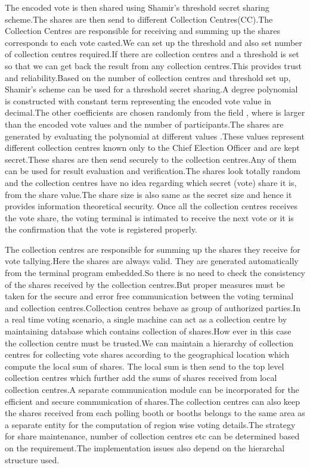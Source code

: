 \documentclass[conference]{IEEEtran}
\begin{document}
The encoded vote is then shared using Shamir's threshold secret sharing scheme.The shares are then send to different Collection Centres(CC).The Collection Centres are responsible for receiving and summing up the shares corresponds to each vote casted.We can set up the threshold and also set number of collection centres required.If there are  collection centres  and a threshold  is set so that we can get back the result from any  collection centres.This provides trust and reliability.Based on the number of collection centres and threshold set up, Shamir's scheme can be used for a threshold  secret sharing.A  degree polynomial  is constructed with constant term representing the encoded vote value in decimal.The other coefficients are chosen randomly from the field , where  is larger than the encoded vote values and the number of participants.The shares are generated by evaluating the polynomial  at  different values .These  values represent different collection centres known only to the Chief Election Officer and are kept secret.These shares are then send securely to the  collection centres.Any  of them can be used for result evaluation and verification.The shares look totally random and the collection centres have no idea regarding which secret (vote) share it is, from the share value.The share size is also same as the secret size and hence it provides information theoretical security.
Once all the collection centres receives the vote share, the voting terminal is intimated to receive the next vote or it is the confirmation that the vote is registered properly.

The collection centres are responsible  for summing up the shares they receive for vote tallying.Here the shares are always valid. They are generated automatically from the terminal program embedded.So there is no need
to check the consistency of the shares received by the collection centres.But proper measures must be taken for the secure and error free communication between the voting terminal and collection centres.Collection centres behave as group of authorized parties.In a real time voting scenario, a single machine can act as a collection centre by maintaining database which contains collection of shares.How ever in this case the collection centre must be trusted.We can maintain a hierarchy of collection  centres for collecting vote shares according to the geographical location which compute the local sum of shares. The local sum is then send to the top level collection centres which further add the sums of shares received from local collection centres.A separate communication module can be incorporated for the efficient and secure communication of shares.The collection centres can also keep the shares received from each polling booth
or booths belongs to the same area as a separate entity for the computation of region wise voting details.The strategy for share maintenance, number of collection centres etc can be determined based on the requirement.The implementation issues also depend on the hierarchal structure used.
\end{document}
